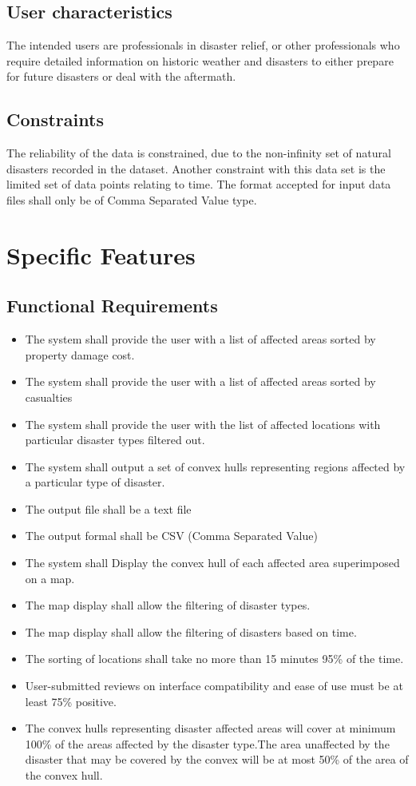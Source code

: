 \documentclass{article}
\begin{document}
    \subsection{User characteristics}
         
        The intended users are professionals in disaster relief, or other professionals 
        who require detailed information on historic weather and disasters to either 
        prepare for future disasters or deal with the aftermath.
     
\subsection{Constraints}
The reliability of the data is constrained, due to the non-infinity set of natural disasters recorded 
in the dataset. Another constraint with this data set is the limited set of data points relating to time.
The format accepted for input data files shall only be of Comma Separated Value type.
 
 
\section{Specific Features }
\subsection{Functional Requirements}
    \begin{itemize}
        \item The system shall provide the user with a list of affected areas sorted by property damage cost.
        \item The system shall provide the user with a list of affected areas sorted by casualties
        \item The system shall provide the user with the list of affected locations with particular disaster types filtered out.
        \item The system shall output a set of convex hulls representing regions affected by a particular type of disaster.
        \item The output file shall be a text file
        \item The output formal shall be CSV (Comma Separated Value)
        \item The system shall Display the convex hull of each affected area superimposed on a map.
        \item The map display shall allow the filtering of disaster types.
        \item The map display shall allow the filtering of disasters based on time.
        \item The sorting of locations shall take no more than 15 minutes 95\% of the time.
        \item User-submitted reviews on interface compatibility and ease of use must be at least 75\% positive.
        \item The convex hulls representing disaster affected areas will cover at minimum 100\% of the areas affected by the disaster type.The area unaffected by the disaster that may be covered by the convex will be at most 50\% of the area of the convex hull.
    
    \end{itemize}
\end{document}
